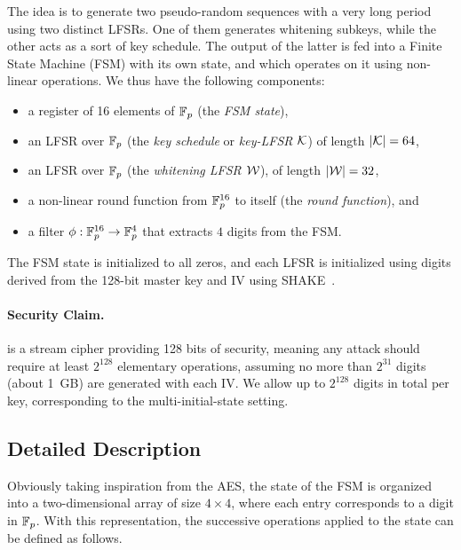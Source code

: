 The idea is to generate two pseudo-random sequences with a very long
period using two distinct LFSRs. One of them generates whitening
subkeys, while the other acts as a sort of key schedule. The output of
the latter is fed into a Finite State Machine (FSM) with its own
state, and which operates on it using non-linear operations. We thus
have the following components:
\begin{itemize}
\item a register of 16 elements of $\mathbb{F}_{p}$ (the \emph{FSM state}),
\item an LFSR over $\mathbb{F}_{p}$ (the \emph{key schedule} or \emph{key-LFSR} $\mathcal{K}$) of length $|\mathcal{K}| = 64$, 
\item an LFSR over $\mathbb{F}_{p}$ (the \emph{whitening LFSR} $\mathcal{W}$), of length $|\mathcal{W}| = 32$,
\item a non-linear round function from $\mathbb{F}_{p}^{16}$ to itself (the \emph{round function}), and
\item a filter $\phi : \mathbb{F}_{p}^{16} \to \mathbb{F}_{p}^4$ that extracts $4$ digits from the FSM.
\end{itemize}



The FSM state is initialized to all zeros, and each LFSR is initialized using digits derived from the 128-bit master key and IV using SHAKE~\cite{add:SHA3}. 


\paragraph{Security Claim.} \coolName{} is a stream cipher providing 128 bits of security, meaning any attack should require at least $2^{128}$ elementary operations, assuming no more than $2^{31}$ digits (about 1~GB) are generated with each IV.  We allow up to $2^{128}$ digits in total per key, corresponding to the multi-initial-state setting.





\subsection{Detailed Description}
\label{sec:sepc-details}

Obviously taking inspiration from the AES, the state of the FSM is organized into a two-dimensional array of size $4\times 4$, where each entry corresponds to a digit in $\mathbb{F}_p$. With this representation, the successive operations applied to the state can be defined as follows.

